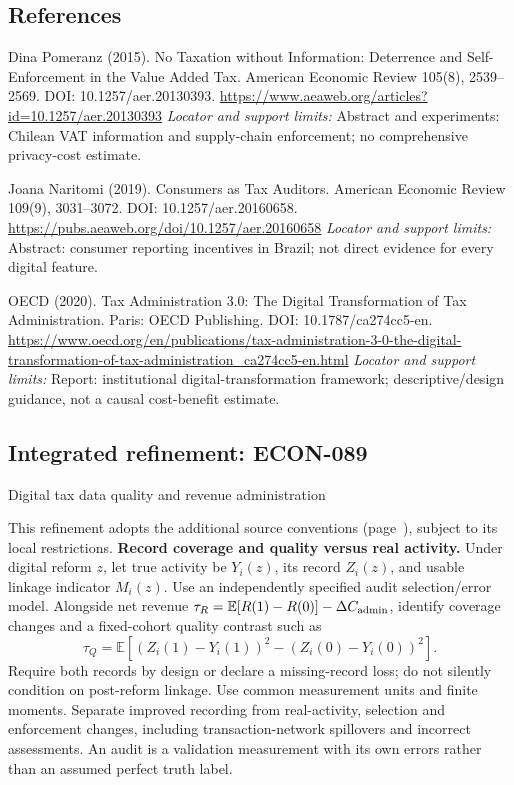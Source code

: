 \documentclass[11pt,a4paper]{article}
\begin{document}
\subsection*{References}
\begin{enumerate}[label={[S\arabic*]},leftmargin=*,itemsep=0.6em]
\item Dina Pomeranz (2015). No Taxation without Information: Deterrence and Self-Enforcement in the Value Added Tax. American Economic Review 105(8), 2539--2569. DOI: 10.1257/aer.20130393.
\url{https://www.aeaweb.org/articles?id=10.1257/aer.20130393}
\newline\emph{Locator and support limits:} Abstract and experiments: Chilean VAT information and supply-chain enforcement; no comprehensive privacy-cost estimate.
\item Joana Naritomi (2019). Consumers as Tax Auditors. American Economic Review 109(9), 3031--3072. DOI: 10.1257/aer.20160658.
\url{https://pubs.aeaweb.org/doi/10.1257/aer.20160658}
\newline\emph{Locator and support limits:} Abstract: consumer reporting incentives in Brazil; not direct evidence for every digital feature.
\item OECD (2020). Tax Administration 3.0: The Digital Transformation of Tax Administration. Paris: OECD Publishing. DOI: 10.1787/ca274cc5-en.
\url{https://www.oecd.org/en/publications/tax-administration-3-0-the-digital-transformation-of-tax-administration_ca274cc5-en.html}
\newline\emph{Locator and support limits:} Report: institutional digital-transformation framework; descriptive/design guidance, not a causal cost-benefit estimate.
\end{enumerate}

\subsection*{Integrated refinement: ECON-089}
{\sffamily\small\color{muted}Digital tax data quality and revenue administration\par}
This refinement adopts the additional source conventions
(page~\pageref{audited:conventions}), subject to its local restrictions.
\textbf{Record coverage and quality versus real activity.}
Under digital reform $z$, let true activity be $Y_i(z)$, its record $Z_i(z)$,
and usable linkage indicator $M_i(z)$. Use an independently specified audit
selection/error model. Alongside net revenue
$\tau_R=\mathbb E[R(1)-R(0)]-\Delta C_{\rm admin}$, identify coverage changes and
a fixed-cohort quality contrast such as
\[
\tau_Q=\mathbb E[(Z_i(1)-Y_i(1))^2-(Z_i(0)-Y_i(0))^2].
\]
Require both records by design or declare a missing-record loss; do not silently
condition on post-reform linkage. Use common measurement units and finite
moments. Separate improved recording from real-activity, selection and
enforcement changes, including transaction-network spillovers and incorrect
assessments. An audit is a validation measurement with its own errors rather
than an assumed perfect truth label.
\end{document}
